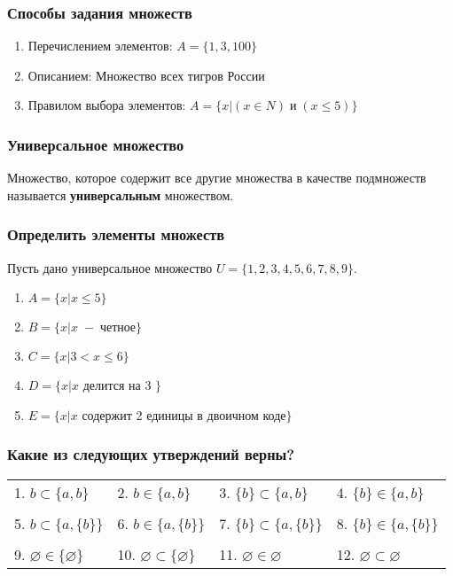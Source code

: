 \begin{frame}
\frametitle{Способы задания множеств}
\begin{enumerate}
	\item Перечислением элементов: $A=\{1,3, 100 \}$ 
	\item Описанием: Множество всех тигров России
	\item Правилом выбора элементов: $A=\{x|(x\in N)\; и\;(x \leq 5) \}$
\end{enumerate}

\end{frame}

\begin{frame}
\frametitle{Универсальное множество}

Множество, которое содержит все другие множества в качестве подмножеств называется \textbf{универсальным} множеством.

\end{frame}

\begin{frame}
\frametitle{Определить элементы множеств}

Пусть дано универсальное множество $U=\{1,2,3,4,5,6,7,8,9\}$.

\begin{enumerate}
	\item $A=\{x|x \leq 5\}$\pause
	\item $B=\{x|x\; -\; четное\}$\pause
	\item $C=\{x|3<x \leq 6\}$\pause
	\item $D=\{x|x$ делится на 3 $\}$\pause
	\item $E=\{x|x$ содержит 2 единицы в двоичном коде$\}$
\end{enumerate}

\end{frame}

\begin{frame}
\frametitle{Какие из следующих утверждений верны?}
\small
\begin{tabular}{llll}
1. $b\subset \{a,b\}$ \pause &	2. $b\in \{a,b\}$ \pause &	3. $\{b\} \subset \{a,b\}$ \pause&	4. $\{b\} \in \{a,b\}$ \pause\tabularnewline
 & & & \tabularnewline
5. $b\subset \{a,\{b\}\}$ \pause &	 6. $b\in \{a,\{b\}\}$\pause &	 7. $\{b\}\subset \{a,\{b\}\}$ \pause &	 8. $\{b\}\in \{a,\{b\}\}$\pause \tabularnewline
& & & \tabularnewline
 9. $\varnothing \in \{ \varnothing\}$ \pause& 10. $\varnothing \subset \{ \varnothing\}$ \pause & 11. $\varnothing \in \varnothing$	\pause & 12. $\varnothing \subset \varnothing$ \tabularnewline

\end{tabular}
\end{frame}

